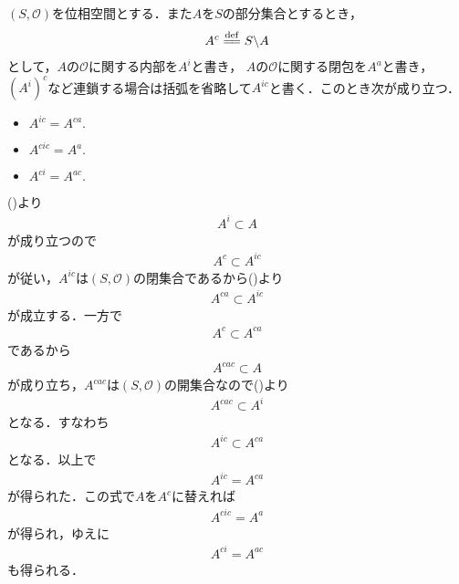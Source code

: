 	\begin{screen}
		\begin{thm}[内部の補集合は補集合の閉包]
		\label{thm:topology_note_closure_interior}
			$(S,\mathscr{O})$を位相空間とする．また$A$を$S$の部分集合とするとき，
			\begin{align}
				A^c \defeq S \backslash A
			\end{align}
			として，$A$の$\mathscr{O}$に関する内部を$A^i$と書き，
			$A$の$\mathscr{O}$に関する閉包を$A^a$と書き，
			$(A^i)^c$など連鎖する場合は括弧を省略して$A^{ic}$と書く．このとき次が成り立つ．
			\begin{itemize}
				\item $A^{ic} = A^{ca}.$
				\item $A^{cic} = A^a.$
				\item $A^{ci} = A^{ac}.$
			\end{itemize}
		\end{thm}
	\end{screen}
	
	\begin{prf}
		()より
		\begin{align}
			A^i \subset A
		\end{align}
		が成り立つので
		\begin{align}
			A^c \subset A^{ic}
		\end{align}
		が従い，$A^{ic}$は$(S,\mathscr{O})$の閉集合であるから()より
		\begin{align}
			A^{ca} \subset A^{ic} 
		\end{align}
		が成立する．一方で
		\begin{align}
			A^c \subset A^{ca}
		\end{align}
		であるから
		\begin{align}
			A^{cac} \subset A
		\end{align}
		が成り立ち，$A^{cac}$は$(S,\mathscr{O})$の開集合なので()より
		\begin{align}
			A^{cac} \subset A^i
		\end{align}
		となる．すなわち
		\begin{align}
			A^{ic} \subset A^{ca}
		\end{align}
		となる．以上で
		\begin{align}
			A^{ic} = A^{ca}
		\end{align}
		が得られた．この式で$A$を$A^c$に替えれば
		\begin{align}
			A^{cic} = A^a
		\end{align}
		が得られ，ゆえに
		\begin{align}
			A^{ci} = A^{ac}
		\end{align}
		も得られる．
		\QED
	\end{prf}